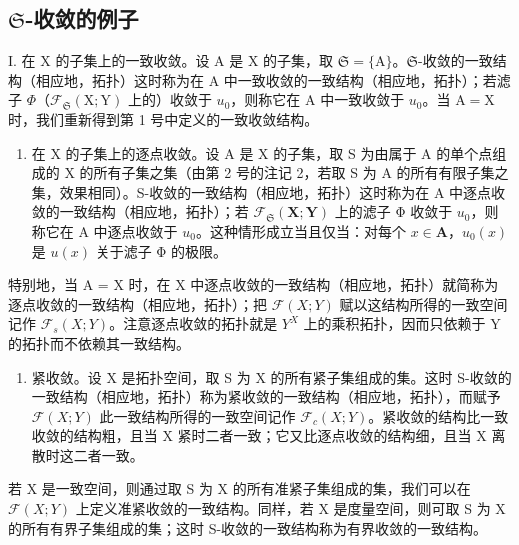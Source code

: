 \subsection{\texorpdfstring{\(\mathfrak{S}\)-收敛的例子}{S-收敛的例子}}

I. 在 X 的子集上的一致收敛。设 A 是 X 的子集，取 \(\mathfrak{S} = \{\mathrm{A}\}\)。\(\mathfrak{S}\)-收敛的一致结构（相应地，拓扑）这时称为在 A 中一致收敛的一致结构（相应地，拓扑）；若滤子 \(\Phi\)（\(\mathcal{F}_{\mathfrak{S}}(\mathrm{X};\mathrm{Y})\) 上的）收敛于 \(u_0\)，则称它在 A 中一致收敛于 \(u_0\)。当 \(\mathrm{A} = \mathrm{X}\) 时，我们重新得到第 1 号中定义的一致收敛结构。

\begin{enumerate}
\def\labelenumi{\Roman{enumi}.}
\setcounter{enumi}{1}
\tightlist
\item
  在 X 的子集上的逐点收敛。设 A 是 X 的子集，取 S 为由属于 A 的单个点组成的 X 的所有子集之集（由第 2 号的注记 2，若取 S 为 A 的所有有限子集之集，效果相同）。S-收敛的一致结构（相应地，拓扑）这时称为在 A 中逐点收敛的一致结构（相应地，拓扑）；若 \(\mathcal{F}_{\mathfrak{S}}(\mathbf{X};\mathbf{Y})\) 上的滤子 Φ 收敛于 \(u_0\)，则称它在 A 中逐点收敛于 \(u_0\)。这种情形成立当且仅当：对每个 \(x\in \mathbf{A}\)，\(u_0(x)\) 是 \(u(x)\) 关于滤子 Φ 的极限。
\end{enumerate}

特别地，当 A = X 时，在 X 中逐点收敛的一致结构（相应地，拓扑）就简称为逐点收敛的一致结构（相应地，拓扑）；把 \(\mathcal{F}(X; Y)\) 赋以这结构所得的一致空间记作 \(\mathcal{F}_{s}(X; Y)\)。注意逐点收敛的拓扑就是 \(Y^{X}\) 上的乘积拓扑，因而只依赖于 Y 的拓扑而不依赖其一致结构。

\begin{enumerate}
\def\labelenumi{\Roman{enumi}.}
\setcounter{enumi}{2}
\tightlist
\item
  紧收敛。设 X 是拓扑空间，取 S 为 X 的所有紧子集组成的集。这时 S-收敛的一致结构（相应地，拓扑）称为紧收敛的一致结构（相应地，拓扑），而赋予 \(\mathcal{F}(X;Y)\) 此一致结构所得的一致空间记作 \(\mathcal{F}_{c}(X;Y)\)。紧收敛的结构比一致收敛的结构粗，且当 X 紧时二者一致；它又比逐点收敛的结构细，且当 X 离散时这二者一致。
\end{enumerate}

若 X 是一致空间，则通过取 S 为 X 的所有准紧子集组成的集，我们可以在 \(\mathcal{F}(X;Y)\) 上定义准紧收敛的一致结构。同样，若 X 是度量空间，则可取 S 为 X 的所有有界子集组成的集；这时 S-收敛的一致结构称为有界收敛的一致结构。

